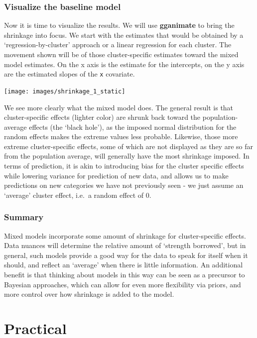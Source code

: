 \documentclass[
  12pt,
]{book}
\begin{document}
\hypertarget{visualize-the-baseline-model}{%
\subsubsection{Visualize the baseline model}\label{visualize-the-baseline-model}}

Now it is time to visualize the results. We will use \textbf{gganimate} to bring the shrinkage into focus. We start with the estimates that would be obtained by a `regression-by-cluster' approach or a linear regression for each cluster. The movement shown will be of those cluster-specific estimates toward the mixed model estimates. On the x axis is the estimate for the intercepts, on the y axis are the estimated slopes of the \texttt{x} covariate.

\texttt{[image: images/shrinkage\_1\_static]}

We see more clearly what the mixed model does. The general result is that cluster-specific effects (lighter color) are shrunk back toward the population-average effects (the `black hole'), as the imposed normal distribution for the random effects makes the extreme values less probable. Likewise, those more extreme cluster-specific effects, some of which are not displayed as they are so far from the population average, will generally have the most shrinkage imposed. In terms of prediction, it is akin to introducing bias for the cluster specific effects while lowering variance for prediction of new data, and allows us to make predictions on new categories we have not previously seen - we just assume an `average' cluster effect, i.e.~a random effect of 0.

\hypertarget{summary}{%
\subsubsection{Summary}\label{summary}}

Mixed models incorporate some amount of shrinkage for cluster-specific effects. Data nuances will determine the relative amount of `strength borrowed', but in general, such models provide a good way for the data to speak for itself when it should, and reflect an `average' when there is little information. An additional benefit is that thinking about models in this way can be seen as a precursor to Bayesian approaches, which can allow for even more flexibility via priors, and more control over how shrinkage is added to the model.

\hypertarget{practical-3}{%
\section{Practical}\label{practical-3}}
\end{document}
